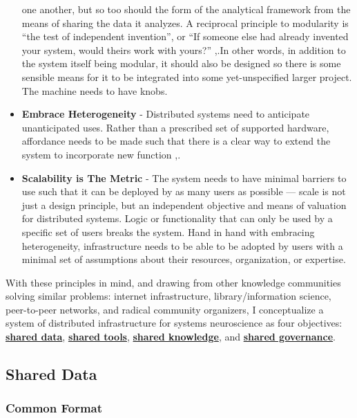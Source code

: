 \documentclass{article}
\begin{document}
\begin{itemize}
  one another, but so too should the form of the analytical framework
  from the means of sharing the data it analyzes. A reciprocal principle
  to modularity is ``the test of independent invention'', or ``If
  someone else had already invented your system, would theirs work with
  yours?'' \cite{berners-leePrinciplesDesign1998},.In other
  words, in addition to the system itself being modular, it should also
  be designed so there is some sensible means for it to be integrated
  into some yet-unspecified larger project. The machine needs to have
  knobs.
\item
  \textbf{Embrace Heterogeneity} - Distributed systems need to
  anticipate unanticipated uses. Rather than a prescribed set of
  supported hardware, affordance needs to be made such that there is a
  clear way to extend the system to incorporate new function \cite{carpenterRFC1958Architectural1996},.\item
  \textbf{Scalability is The Metric} - The system needs to have minimal
  barriers to use such that it can be deployed by as many users as
  possible --- scale is not just a design principle, but an independent
  objective and means of valuation for distributed systems. Logic or
  functionality that can only be used by a specific set of users breaks
  the system. Hand in hand with embracing heterogeneity, infrastructure
  needs to be able to be adopted by users with a minimal set of
  assumptions about their resources, organization, or expertise.
\end{itemize}

With these principles in mind, and drawing from other knowledge
communities solving similar problems: internet infrastructure,
library/information science, peer-to-peer networks, and radical
community organizers, I conceptualize a system of distributed
infrastructure for systems neuroscience as four objectives:
\protect\hyperlink{shared-data}{\textbf{shared data}},
\protect\hyperlink{shared-tools}{\textbf{shared tools}},
\protect\hyperlink{shared-knowledge}{\textbf{shared knowledge}}, and
\protect\hyperlink{shared-governance}{\textbf{shared governance}}.

\hypertarget{shared-data}{%
\subsection{Shared Data}\label{shared-data}}

\hypertarget{common-format}{%
\subsubsection{Common Format}\label{common-format}}
\end{document}
